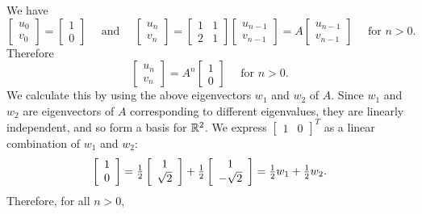 \documentclass[a4paper]{amsart}
\renewenvironment{solution}{\SolutionInline}{\endSolutionInline}
\begin{document}
\begin{solution}
 We have
 $$
 \left[ \begin{array}{c}u_{0}\\ v_0 \end{array} \right] =
 \left[ \begin{array}{c}1\\ 0 \end{array} \right]
 \quad \mbox{~and~} \quad
 \left[ \begin{array}{c}u_{n}\\ v_{n} \end{array} \right] =
 \left[ \begin{array}{cc} 1 & 1 \\ 2 & 1 \end{array} \right]
 \left[ \begin{array}{c}u_{n-1}\\ v_{n-1} \end{array} \right] =
 A\left[ \begin{array}{c}u_{n-1}\\ v_{n-1} \end{array} \right]
 \quad\textrm{\ for\ } n>0.
 $$
 Therefore
 $$
 \left[ \begin{array}{c}u_{n}\\ v_{n} \end{array} \right] =
 A^{n} \left[\begin{array}{c}1\\ 0 \end{array} \right]
 \quad\textrm{\ for\ } n>0.
 $$
 We calculate this by using the above eigenvectors $w_1$ and $w_2$ of
 $A$. Since $w_1$ and $w_2$ are eigenvectors of $A$ corresponding to
 different eigenvalues, they are linearly independent, and so form a
 basis for ${\mathbb{R}}^2$.
 We express
 $\left[ \begin{array}{cc}1&0 \end{array} \right]^T$
 as a linear combination of $w_1$ and $w_2$:
 $$
 \left[ \begin{array}{c}1\\ 0 \end{array} \right] =
 {\textstyle \tfrac{1}{2} \left[ \begin{array}{c}1\\ \sqrt{2} \end{array} \right] +
 \tfrac{1}{2} \left[ \begin{array}{c}1\\ -\sqrt{2} \end{array} \right] =
 \tfrac{1}{2} w_1 + \tfrac{1}{2} w_2}.
 $$
 Therefore, for all $n > 0$,
 \begin{align*}

\end{align*}
\end{solution}
\end{document}
